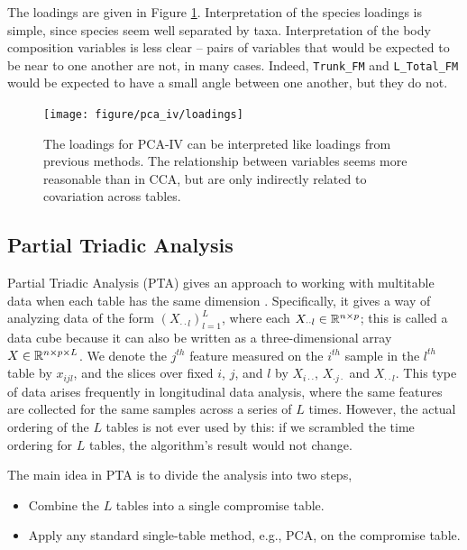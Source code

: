\documentclass[14pt]{extarticle}
\begin{document}
The loadings are given in Figure \ref{fig:pca_iv_loadings}. Interpretation of
the species loadings is simple, since species seem well separated by taxa.
Interpretation of the body composition variables is less clear -- pairs of
variables that would be expected to be near to one another are not, in many
cases. Indeed, \texttt{Trunk\_FM} and \texttt{L\_Total\_FM} would be expected to
have a small angle between one another, but they do not.

\begin{figure}
  \centering
  \texttt{[image: figure/pca\_iv/loadings]}
  \caption{The loadings for PCA-IV can be interpreted like loadings from
    previous methods. The relationship between variables seems more reasonable
    than in CCA, but are only indirectly related to covariation across
    tables. \label{fig:pca_iv_loadings} }
\end{figure}

\subsection{Partial Triadic Analysis}
\label{subsec:partial_triadic_analysis}

Partial Triadic Analysis (PTA) gives an approach to working with multitable data
when each table has the same dimension \citep{thioulouse2011simultaneous}.
Specifically, it gives a way of analyzing data of the form $\left(X_{\cdot\cdot
  l}\right)_{l = 1}^{L}$, where each $X_{\cdot\cdot l} \in \mathbb{R}^{n \times p}$;
this is called a data cube because it can also be written as a three-dimensional
array $X \in \mathbb{R}^{n \times p \times L}$. We denote the $j^{th}$ feature
measured on the $i^{th}$ sample in the $l^{th}$ table by $x_{ijl}$, and the
slices over fixed $i$, $j$, and $l$ by $X_{i \cdot \cdot}$, $X_{\cdot j \cdot}$
and $X_{\cdot \cdot l}$. This type of data arises frequently in longitudinal
data analysis, where the same features are collected for the same samples across
a series of $L$ times. However, the actual ordering of the $L$ tables is not
ever used by this: if we scrambled the time ordering for $L$ tables, the
algorithm's result would not change.

The main idea in PTA is to divide the analysis into two steps,
\begin{itemize}
  \item Combine the $L$ tables into a single compromise table.
  \item Apply any standard single-table method, e.g., PCA, on the
    compromise table.
\end{itemize}
\end{document}
